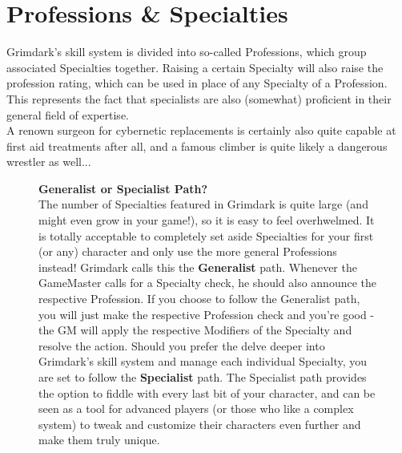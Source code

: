 \chapter{Professions \& Specialties}
Grimdark's skill system is divided into so-called Professions, which group associated Specialties together. Raising a certain Specialty will also raise the profession rating, which can be used in place of any Specialty of a Profession. 
This represents the fact that specialists are also (somewhat) proficient in their general field of expertise.\\
A renown surgeon for cybernetic replacements is certainly also quite capable at first aid treatments after all, and a famous climber is quite likely a dangerous wrestler as well...
\begin{figure}[ht]
	\begin{DndReadAloud}
	{\large\textbf{Generalist or Specialist Path?}}\\\noindent
	The number of Specialties featured in Grimdark is quite large (and might even grow in your game!), so it is easy to feel overhwelmed.
	It is totally acceptable to completely set aside Specialties for your first (or any) character and only use the more general Professions instead! Grimdark calls this the \textbf{Generalist} path.
	Whenever the GameMaster calls for a Specialty check, he should also announce the respective Profession.
	If you choose to follow the Generalist path, you will just make the respective Profession check and you're good - the GM will apply the respective Modifiers of the Specialty and resolve the action.
\noindent
	Should you prefer the delve deeper into Grimdark's skill system and manage each individual Specialty, you are set to follow the \textbf{Specialist} path.
	The Specialist path provides the option to fiddle with every last bit of your character, and can be seen as a tool for advanced players (or those who like a complex system) to tweak and customize their characters even further and make them truly unique.
	\end{DndReadAloud}
\end{figure}

